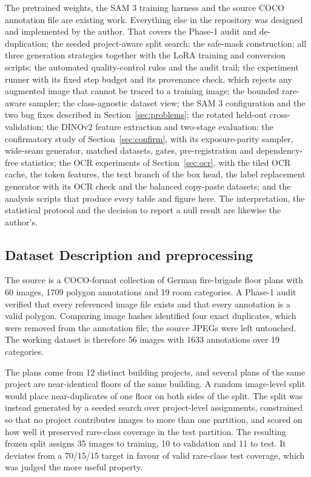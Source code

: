 The pretrained weights, the SAM 3 training harness and the source COCO
annotation file are existing work. Everything else in the repository was
designed and implemented by the author. That covers the Phase-1 audit and
de-duplication; the seeded project-aware split search; the safe-mask
construction; all three generation strategies together with the LoRA training
and conversion scripts; the automated quality-control rules and the audit trail;
the experiment runner with its fixed step budget and its provenance check, which
rejects any augmented image that cannot be traced to a training image; the
bounded rare-aware sampler; the class-agnostic dataset view; the SAM 3
configuration and the two bug fixes described in Section~\ref{sec:problems}; the
rotated held-out cross-validation; the DINOv2 feature extraction and two-stage
evaluation; the confirmatory study of Section~\ref{sec:confirm}, with its
exposure-parity sampler, wide-seam generator, matched datasets, gates,
pre-registration and dependency-free statistics; the OCR experiments of
Section~\ref{sec:ocr}, with the tiled OCR cache, the token features, the text
branch of the box head, the label replacement generator with its OCR check and
the balanced copy-paste datasets; and the analysis scripts that produce every
table and figure here.
The interpretation, the statistical protocol and the decision to report a null
result are likewise the author's.

\subsection{Dataset Description and preprocessing}
\label{sec:dataset}

The source is a COCO-format collection of German fire-brigade floor plans with
60 images, 1709 polygon annotations and 19 room categories. A Phase-1 audit
verified that every referenced image file exists and that every annotation is a
valid polygon. Comparing image hashes identified four exact duplicates, which
were removed from the annotation file; the source JPEGs were left untouched. The
working dataset is therefore 56 images with 1633 annotations over 19 categories.

The plans come from 12 distinct building projects, and several plans of the same
project are near-identical floors of the same building. A random image-level
split would place near-duplicates of one floor on both sides of the split. The
split was instead generated by a seeded search over project-level assignments,
constrained so that no project contributes images to more than one partition,
and scored on how well it preserved rare-class coverage in the test partition.
The resulting frozen split assigns 35 images to training, 10 to validation and
11 to test. It deviates from a 70/15/15 target in favour of valid rare-class
test coverage, which was judged the more useful property.

